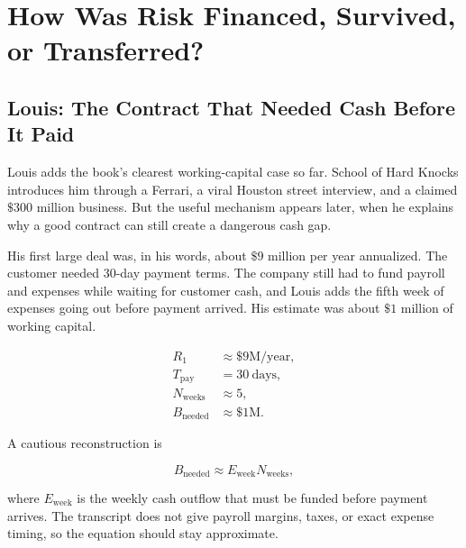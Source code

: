 \documentclass[11pt,oneside]{book}
\begin{document}

\chapter{How Was Risk Financed, Survived, or Transferred?}

\section{Louis: The Contract That Needed Cash Before It Paid}

Louis adds the book's clearest working-capital case so far. School of Hard Knocks introduces him through a Ferrari, a viral Houston street interview, and a claimed \(\$300\) million business. But the useful mechanism appears later, when he explains why a good contract can still create a dangerous cash gap.

His first large deal was, in his words, about \(\$9\) million per year annualized. The customer needed 30-day payment terms. The company still had to fund payroll and expenses while waiting for customer cash, and Louis adds the fifth week of expenses going out before payment arrived. His estimate was about \(\$1\) million of working capital.

\begin{align}
R_1 &\approx \$9\mathrm{M/year},\\
T_{\mathrm{pay}} &= 30\ \mathrm{days},\\
N_{\mathrm{weeks}} &\approx 5,\\
B_{\mathrm{needed}} &\approx \$1\mathrm{M}.
\end{align}

A cautious reconstruction is

\begin{equation}
B_{\mathrm{needed}}
\approx
E_{\mathrm{week}}N_{\mathrm{weeks}},
\end{equation}

where \(E_{\mathrm{week}}\) is the weekly cash outflow that must be funded before payment arrives. The transcript does not give payroll margins, taxes, or exact expense timing, so the equation should stay approximate.
\end{document}

